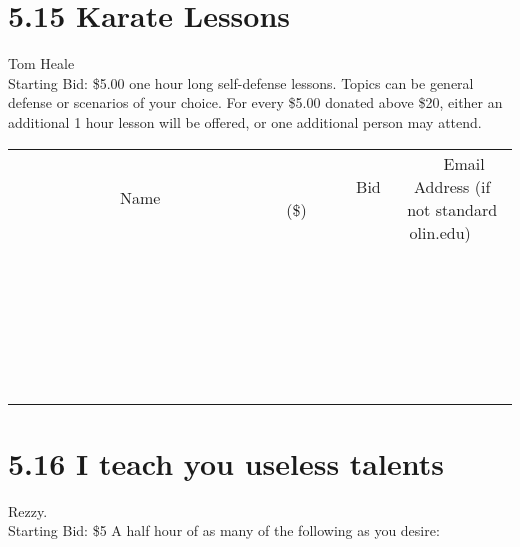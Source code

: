 \documentclass[11pt]{article}
\begin{document}
\section*{5.15 Karate Lessons}
Tom Heale
\\
Starting Bid: \$5.00
 one hour long self-defense lessons. Topics can be general defense or scenarios of your choice. For every \$5.00 donated above \$20, either an additional 1 hour lesson will be offered, or one additional person may attend.
\\[6ex]
\begin{tabular}{c c c}
~~~~~~~~~~~~~Name~~~~~~~~~~~~~ & ~~~~~~~~~Bid (\$)~~~~~~~~~  & ~~~Email Address (if not standard olin.edu)~~~\\
 & & \\
\hline
 & & \\
\hline
 & & \\
\hline
 & & \\
\hline
 & & \\
\hline
 & & \\
\hline
 & & \\
\hline
 & & \\
\hline
 & & \\
\hline
 & & \\
\hline
 & & \\
\hline
 & & \\
\hline
 & & \\
\hline
 & & \\
\hline
 & & \\
\hline
 & & \\
\hline
 & & \\
\hline
 & & \\
\hline
 & & \\
\hline
 & & \\
\hline
 & & \\
\hline
 & & \\
\hline
 & & \\
\hline
 & & \\
\hline
 & & \\
\hline
 & & \\
\hline
\end{tabular}
\newpage
\section*{5.16 I teach you useless talents}
Rezzy.
\\
Starting Bid: \$5
\newline
A half hour of as many of the following as you desire:
\end{document}
